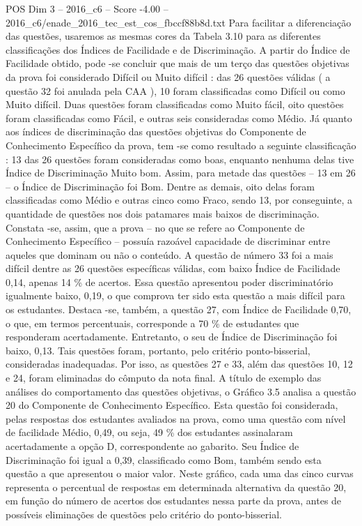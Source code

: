 \begin{textsample}{POS Dim 3 – 2016\_c6 – Score -4.00 – 2016\_c6/enade\_2016\_tec\_est\_cos\_fbccf88b8d.txt}
Para facilitar a diferenciação das questões, usaremos as mesmas cores da Tabela 3.10 para as diferentes classificações dos Índices de Facilidade e de Discriminação.
A partir do Índice de Facilidade obtido, pode -se concluir que mais de um terço das questões objetivas da prova foi considerado Difícil ou Muito difícil : das 26 questões válidas ( a questão 32 foi anulada pela CAA ), 10 foram classificadas como Difícil ou como Muito difícil.
Duas questões foram classificadas como Muito fácil, oito questões foram classificadas como Fácil, e outras seis consideradas como Médio.
Já quanto aos índices de discriminação das questões objetivas do Componente de Conhecimento Específico da prova, tem -se como resultado a seguinte classificação : 13 das 26 questões foram consideradas como boas, enquanto nenhuma delas tive Índice de Discriminação Muito bom.
Assim, para metade das questões – 13 em 26 – o Índice de Discriminação foi Bom.
Dentre as demais, oito delas foram classificadas como Médio e outras cinco como Fraco, sendo 13, por conseguinte, a quantidade de questões nos dois patamares mais baixos de discriminação.
Constata -se, assim, que a prova – no que se refere ao Componente de Conhecimento Específico – possuía razoável capacidade de discriminar entre aqueles que dominam ou não o conteúdo.
A questão de número 33 foi a mais difícil dentre as 26 questões específicas válidas, com baixo Índice de Facilidade 0,14, apenas 14 \% de acertos.
Essa questão apresentou poder discriminatório igualmente baixo, 0,19, o que comprova ter sido esta questão a mais difícil para os estudantes.
Destaca -se, também, a questão 27, com Índice de Facilidade 0,70, o que, em termos percentuais, corresponde a 70 \% de estudantes que responderam acertadamente.
Entretanto, o seu de Índice de Discriminação foi baixo, 0,13.
Tais questões foram, portanto, pelo critério ponto-bisserial, consideradas inadequadas.
Por isso, as questões 27 e 33, além das questões 10, 12 e 24, foram eliminadas do cômputo da nota final.
A título de exemplo das análises do comportamento das questões objetivas, o Gráfico 3.5 analisa a questão 20 do Componente de Conhecimento Específico.
Esta questão foi considerada, pelas respostas dos estudantes avaliados na prova, como uma questão com nível de facilidade Médio, 0,49, ou seja, 49 \% dos estudantes assinalaram acertadamente a opção D, correspondente ao gabarito.
Seu Índice de Discriminação foi igual a 0,39, classificado como Bom, também sendo esta questão a que apresentou o maior valor.
Neste gráfico, cada uma das cinco curvas representa o percentual de respostas em determinada alternativa da questão 20, em função do número de acertos dos estudantes nessa parte da prova, antes de possíveis eliminações de questões pelo critério do ponto-bisserial.

\end{textsample}
